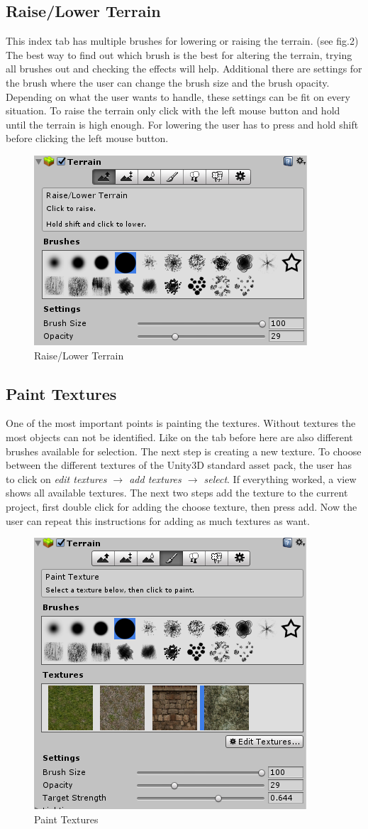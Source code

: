 \documentclass[12pt, a4paper, titlepage]{article}
\begin{document}
\subsection{Raise/Lower Terrain}
This index tab has multiple brushes for lowering or raising the terrain. (see fig.2) The best way to find out which brush is the
best for altering the terrain, trying all brushes out and checking the effects will help. Additional there are settings for the brush where the user can change the brush size and the brush opacity. Depending on what the user wants to handle, these settings can be fit on every situation. To raise the terrain only click with the left mouse button and hold until the terrain is high enough. For lowering the user has to press and hold shift before clicking the left mouse button.
 
\begin{figure}[htbp]
  \centering
  \includegraphics[width=.4\textwidth]{pictures/raise_lower_terrain}
  \caption{Raise/Lower Terrain}
  \label{fig:raise_lower_terrain}
\end{figure}

\subsection{Paint Textures}
One of the most important points is painting the textures. Without textures the most objects can not be identified. 
Like on the tab before here are also different brushes available for selection. The next step is creating a new texture. 
To choose between the different textures of the Unity3D standard asset pack, the user has to click on \emph{edit textures $\rightarrow$ add textures $\rightarrow$ select}. If everything worked, a view shows all available textures. The next two steps add the texture to the current project, first double click for adding the choose texture, then press add. Now the user can repeat this instructions for adding as much textures as want.

\begin{figure}[htbp]
  \centering
  \includegraphics[width=.4\textwidth]{pictures/paint_textures}
  \caption{Paint Textures}
  \label{fig:paint_textures}
\end{figure}
\end{document}
